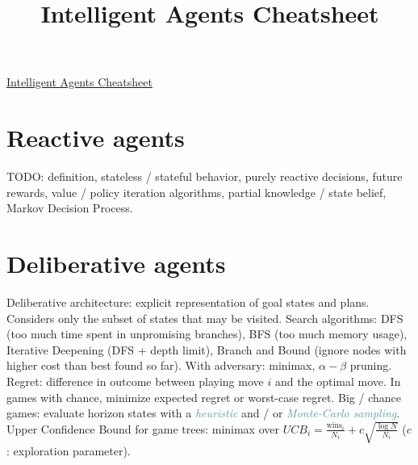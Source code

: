 \documentclass[10pt,a4paper,landscape]{article}
\newcommand{\concept}[1]{\textcolor{Emerald}{#1}} %
\newcommand{\subconcept}[1]{\textcolor{CadetBlue}{\textit{#1}}}
\begin{document}
\title{Intelligent Agents Cheatsheet}

\raggedright
\footnotesize
\sffamily
\begin{multicols*}{4}

\setlength{\premulticols}{1pt}
\setlength{\postmulticols}{1pt}
\setlength{\multicolsep}{1pt}
\setlength{\columnsep}{2pt}

\begin{center}
\Large{\underline{Intelligent Agents Cheatsheet}}
\end{center}

\section{Reactive agents}

TODO: definition, stateless / stateful behavior, purely reactive decisions, future rewards, value / policy iteration algorithms, partial knowledge / state belief, Markov Decision Process.

\section{Deliberative agents}

\concept{Deliberative architecture}: explicit representation of goal states and plans. Considers only the subset of states that may be visited.
\concept{Search algorithms}: DFS (too much time spent in unpromising branches), BFS (too much memory usage), Iterative Deepening (DFS + depth limit), Branch and Bound (ignore nodes with higher cost than best found so far). With adversary: minimax, $\alpha-\beta$ pruning.
\concept{Regret}: difference in outcome between playing move $i$ and the optimal move. In games with chance, minimize expected regret or worst-case regret.
Big / chance games: evaluate horizon states with a \subconcept{heuristic} and / or \subconcept{Monte-Carlo sampling}.
\concept{Upper Confidence Bound} for game trees: minimax over $UCB_i = \frac{\text{wins}_i}{N_i} + c \sqrt{\frac{\log{N}}{N_i}}$ ($c$: exploration parameter).


\end{multicols*}
\end{document}
